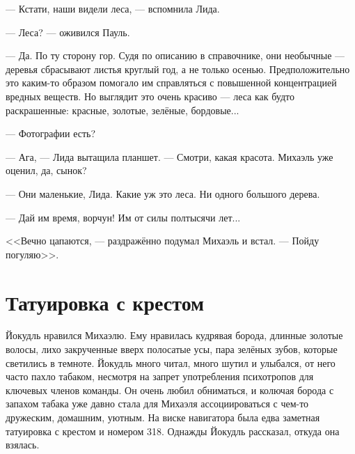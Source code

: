 --- Кстати, наши видели леса, --- вспомнила Лида.

--- Леса? --- оживился Пауль.

--- Да.
По ту сторону гор.
Судя по описанию в справочнике, они необычные --- деревья сбрасывают листья круглый год, а не только осенью.
Предположительно это каким-то образом помогало им справляться с повышенной концентрацией вредных веществ.
Но выглядит это очень красиво --- леса как будто раскрашенные: красные, золотые, зелёные, бордовые...

--- Фотографии есть?

--- Ага, --- Лида вытащила планшет.
--- Смотри, какая красота.
Михаэль уже оценил, да, сынок?

--- Они маленькие, Лида.
Какие уж это леса.
Ни одного большого дерева.

--- Дай им время, ворчун!
Им от силы полтысячи лет...

<<Вечно цапаются, --- раздражённо подумал Михаэль и встал.
--- Пойду погуляю>>.

\section{Татуировка с крестом}

Йокудль нравился Михаэлю.
Ему нравилась кудрявая борода, длинные золотые волосы, лихо закрученные вверх полосатые усы, пара зелёных зубов, которые светились в темноте.
Йокудль много читал, много шутил и улыбался, от него часто пахло табаком, несмотря на запрет употребления психотропов для ключевых членов команды.
Он очень любил обниматься, и колючая борода с запахом табака уже давно стала для Михаэля ассоциироваться с чем-то дружеским, домашним, уютным.
На виске навигатора была едва заметная татуировка с крестом и номером 318.
Однажды Йокудль рассказал, откуда она взялась.

